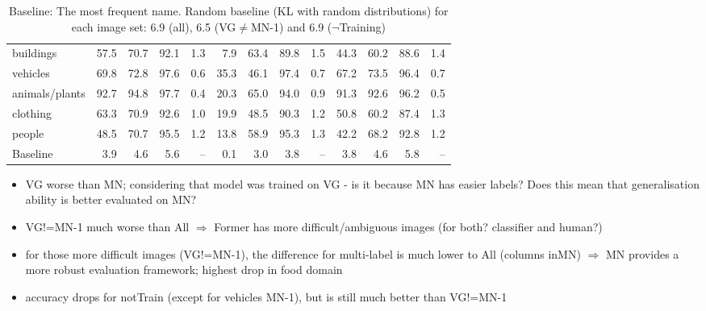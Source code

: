\begin{table*}
\begin{tabular}{l@{~}|@{~}r@{~}r@{~}rr@{~}|@{~}r@{~}r@{~}rr@{~}|@{~}r@{~}r@{~}rr}
buildings      &               57.5 &                 70.7 &                   92.1 &            1.3 &             7.9 &              63.4 &                89.8 &         1.5 &             44.3 &               60.2 &                 88.6 &          1.4 \\
vehicles       &               69.8 &                 72.8 &                   97.6 &            0.6 &            35.3 &              46.1 &                97.4 &         0.7 &             67.2 &               73.5 &                 96.4 &          0.7 \\
animals/plants &               92.7 &                 94.8 &                   97.7 &            0.4 &            20.3 &              65.0 &                94.0 &         0.9 &             91.3 &               92.6 &                 96.2 &          0.5 \\
clothing       &               63.3 &                 70.9 &                   92.6 &            1.0 &            19.9 &              48.5 &                90.3 &         1.2 &             50.8 &               60.2 &                 87.4 &          1.3 \\
people         &               48.5 &                 70.7 &                   95.5 &            1.2 &            13.8 &              58.9 &                95.3 &         1.3 &             42.2 &               68.2 &                 92.8 &          1.2 \\
\bottomrule
Baseline       &                3.9 &                  4.6 &                    5.6 &            -- &             0.1 &               3.0 &                 3.8 &         -- &              3.8 &                4.6 &                  5.8 &          -- \\
\end{tabular}
\caption{Baseline: The most frequent name. Random baseline (KL with random distributions) for each image set: 6.9 (all), 6.5 (VG$\neq$MN-1) and 6.9 ($\neg$Training)	\label{tab:model}}
\end{table*}

\begin{itemize}
	\item VG worse than MN; considering that model was trained on VG - is it because MN has easier labels? Does this mean that generalisation ability is better evaluated on MN?
	\item VG!=MN-1 much worse than All $\Rightarrow$ Former has more difficult/ambiguous images (for both? classifier and human?)
	\item for those more difficult images (VG!=MN-1), the difference for multi-label is much lower to All (columns inMN) $\Rightarrow$ MN provides a more robust evaluation framework; highest drop in food domain
	\item accuracy drops for notTrain (except for vehicles MN-1), but is still much better than VG!=MN-1  
\end{itemize}
